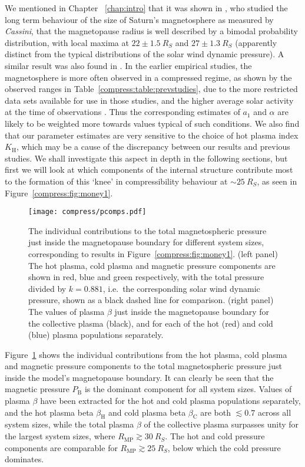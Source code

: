 We mentioned in Chapter~ \ref{chap:intro} that it was shown in \citet{achilleos2008}, who studied the long term behaviour of the size of Saturn's magnetosphere as measured by \textit{Cassini}, that the magnetopause radius is well described by a bimodal probability distribution, with local maxima at $22 \pm \SI{1.5}{R_S}$ and $27 \pm \SI{1.3}{R_S}$ (apparently distinct from the typical distributions of the solar wind dynamic pressure). A similar result was also found in \citet{pilkington2015}. In the earlier empirical studies, the magnetosphere is more often observed in a compressed regime, as shown by the observed ranges in Table~\ref{compress:table:prevstudies}, due to the more restricted data sets available for use in those studies, and the higher average solar activity at the time of observations \cite[e.g.][]{hathaway2015}. Thus the corresponding estimates of $a_1$ and $\alpha$ are likely to be weighted more towards values typical of such conditions. We also find that our parameter estimates are very sensitive to the choice of hot plasma index $K_\mathrm{H}$, which may be a cause of the discrepancy between our results and previous studies. We shall investigate this aspect in depth in the following sections, but first we will look at which components of the internal structure contribute most to the formation of this `knee' in compressibility behaviour at ${\sim}\SI{25}{R_S}$, as seen in Figure~\ref{compress:fig:money1}.

\begin{figure}
\centering
\noindent\texttt{[image: compress/pcomps.pdf]}
\caption[Pressure components and plasma $\beta$ just inside the magnetopause boundary for typical $K_\mathrm{H}$.]{The individual contributions to the total magnetospheric pressure just inside the magnetopause boundary for different system sizes, corresponding to results in Figure~\ref{compress:fig:money1}. (left panel) The hot plasma, cold plasma and magnetic pressure components are shown in red, blue and green respectively, with the total pressure divided by $k=0.881$, i.e.\ the corresponding solar wind dynamic pressure, shown as a black dashed line for comparison. (right panel) The values of plasma $\beta$ just inside the magnetopause boundary for the collective plasma (black), and for each of the hot (red) and cold (blue) plasma populations separately.}
\label{compress:fig:pcomps}
\end{figure}

Figure~\ref{compress:fig:pcomps} shows the individual contributions from the hot plasma, cold plasma and magnetic pressure components to the total magnetospheric pressure just inside the model's magnetopause boundary. It can clearly be seen that the magnetic pressure $P_\mathrm{B}$ is the dominant component for all system sizes. Values of plasma $\beta$ have been extracted for the hot and cold plasma populations separately, and the hot plasma beta $\beta_\mathrm{H}$ and cold plasma beta $\beta_\mathrm{C}$ are both $\lesssim 0.7$ across all system sizes, while the total plasma $\beta$ of the collective plasma surpasses unity for the largest system sizes, where $R_\mathrm{MP} \gtrsim \SI{30}{R_S}$. The hot and cold pressure components are comparable for $R_\mathrm{MP} \gtrsim \SI{25}{R_S}$, below which the cold pressure dominates. 
 
